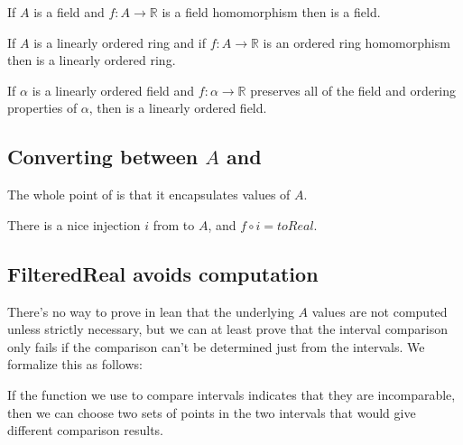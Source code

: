 \begin{lemma}
  \label{thm:filteredField}
  \leanok
  If $A$ is a field and $f : A → ℝ$ is a field homomorphism then 
  is a field.
\end{lemma}

\begin{lemma}
  \label{thm:filteredOrderedRing}
  If $A$ is a linearly ordered ring and if $f : A → ℝ$ is an ordered ring homomorphism then
   is a linearly ordered ring.
\end{lemma}

\begin{theorem}
  \label{thm:filteredOrderedField}
  If $α$ is a linearly ordered field and $f : α → ℝ$ preserves all of the field
  and ordering properties of $α$, then  is a linearly
  ordered field.
\end{theorem}

\subsection{Converting between $A$ and }

The whole point of  is that it encapsulates values of
$A$.

\begin{definition}
  \label{def:filteredEquivalent}
  \notready
  There is a nice injection $i$ from  to
  $A$, and $f \circ i = toReal$.
\end{definition}

\subsection{FilteredReal avoids computation}

There's no way to prove in lean that the underlying $A$ values are not computed
unless strictly necessary, but we can at least prove that the interval
comparison only fails if the comparison can't be determined just from the
intervals. We formalize this as follows:

\begin{lemma}
  \label{thm:compareComplete}
  \leanok
  If the function we use to compare intervals indicates that they are
  incomparable, then we can choose two sets of points in the two intervals that
  would give different comparison results.
\end{lemma}

